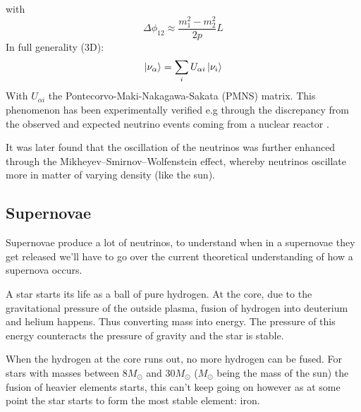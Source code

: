 with
\begin{equation}
	\Delta \phi_{12} \approx \frac{m_1^2 - m_2^2}{2p}L
\end{equation}
In full generality (3D):
\begin{equation}
	\ket{\nu_\alpha} = \sum_iU_{\alpha i} \ket{\nu_i}
\end{equation}
With $U_{\alpha i}$ the Pontecorvo-Maki-Nakagawa-Sakata (PMNS) matrix\cite{1962PThPh..28..870M}.  This
phenomenon has been experimentally verified e.g through the discrepancy from
the observed and expected neutrino events coming from a nuclear reactor \cite{Eguchi_2003}.

It was later found that the oscillation of the neutrinos was further enhanced
through the Mikheyev–Smirnov–Wolfenstein effect, whereby neutrinos oscillate
more in matter of varying density (like the
sun)\cite{smirnov2019mikheyevsmirnovwolfenstein}.
\subsection{Supernovae}
\label{sec:supernovae}
Supernovae produce a lot of neutrinos, to understand when in a supernovae they get released
we'll have to go over the current theoretical understanding of how a supernova occurs. 

A star starts its life as a ball of pure hydrogen. At the core, due to the
gravitational pressure of the outside plasma, fusion of hydrogen into deuterium
and helium happens. Thus converting mass into energy. The pressure of this energy
counteracts the pressure of gravity and the star is stable.

When the hydrogen at the core runs out, no more hydrogen can be fused. For stars
with masses between $8M_\odot$ and $30M_\odot$ ($M_\odot$ being the mass of the sun)
the fusion of heavier elements starts, this can't keep going on however as at
some point the star starts to form the most stable element: iron. 

